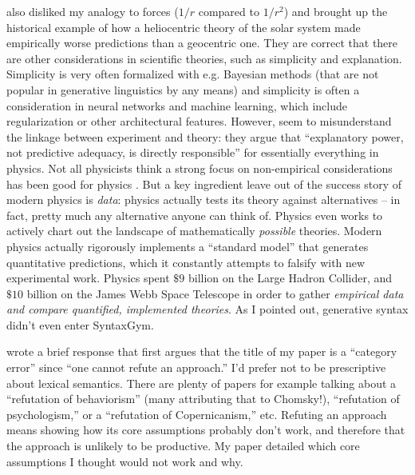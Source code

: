 \documentclass[output=paper,colorlinks,citecolor=brown
]{langscibook}
\begin{document}
\citet{rawski2023modern} also disliked my analogy to forces ($1/r$ compared to $1/r^2$) and brought up the historical example of how a heliocentric theory of the solar system made empirically worse predictions than a geocentric one. They are correct that there are other considerations in scientific theories, such as simplicity and explanation. Simplicity is very often formalized with e.g. Bayesian methods (that are not popular in generative linguistics by any means) and simplicity is often a consideration in neural networks and machine learning, which include regularization or other architectural features. However, \citet{rawski2023modern} seem to misunderstand the linkage between experiment and theory: they argue that ``explanatory power, not predictive adequacy, is directly responsible'' for essentially everything in physics. Not all physicists think a strong focus on non-empirical considerations has been good for physics \citep{hossenfelder2018lost}. But a key ingredient \citet{rawski2023modern} leave out of the success story of modern physics is \textit{data}: physics actually tests its theory against alternatives -- in fact, pretty much any alternative anyone can think of. Physics even works to actively chart out the landscape of mathematically \textit{possible} theories. Modern physics actually rigorously implements a ``standard model'' that generates quantitative predictions, which it constantly attempts to falsify with new experimental work. Physics spent $\$9$ billion on the Large Hadron Collider, and $\$10$ billion on the James Webb Space Telescope in order to gather \textit{empirical data and compare quantified, implemented theories}. As I pointed out, generative syntax didn't even enter SyntaxGym.  %

\citet{milway2023response} wrote a brief response that first argues that the title of my paper is a ``category error'' since ``one cannot refute an approach.'' I'd prefer not to be prescriptive about lexical semantics. There are plenty of papers for example talking about a ``refutation of behaviorism'' (many attributing that to Chomsky!), ``refutation of psychologism,'' or a ``refutation of Copernicanism,'' etc. Refuting an approach means showing how its core assumptions probably don't work, and therefore that the approach is unlikely to be productive. My paper detailed which core assumptions I thought would not work and why. 
\end{document}
